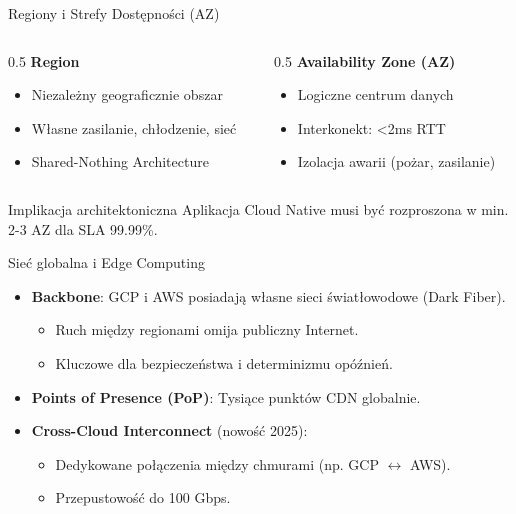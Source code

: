 \documentclass[aspectratio=169]{beamer}
\begin{document}
\begin{frame}{Regiony i Strefy Dostępności (AZ)}
    \begin{columns}
        \begin{column}{0.5\textwidth}
            \textbf{Region}
            \begin{itemize}
                \item Niezależny geograficznie obszar
                \item Własne zasilanie, chłodzenie, sieć
                \item Shared-Nothing Architecture
            \end{itemize}
        \end{column}
        \begin{column}{0.5\textwidth}
            \textbf{Availability Zone (AZ)}
            \begin{itemize}
                \item Logiczne centrum danych
                \item Interkonekt: <2ms RTT
                \item Izolacja awarii (pożar, zasilanie)
            \end{itemize}
        \end{column}
    \end{columns}
    \begin{alertblock}{Implikacja architektoniczna}
        Aplikacja Cloud Native musi być rozproszona w min. 2-3 AZ dla SLA 99.99\%.
    \end{alertblock}
\end{frame}

\begin{frame}{Sieć globalna i Edge Computing}
    \begin{itemize}
        \item \textbf{Backbone}: GCP i AWS posiadają własne sieci światłowodowe (Dark Fiber).
        \begin{itemize}
            \item Ruch między regionami omija publiczny Internet.
            \item Kluczowe dla bezpieczeństwa i determinizmu opóźnień.
        \end{itemize}
        \item \textbf{Points of Presence (PoP)}: Tysiące punktów CDN globalnie.
        \item \textbf{Cross-Cloud Interconnect} (nowość 2025):
        \begin{itemize}
            \item Dedykowane połączenia między chmurami (np. GCP $\leftrightarrow$ AWS).
            \item Przepustowość do 100 Gbps.
        \end{itemize}
    \end{itemize}
\end{frame}
\end{document}
